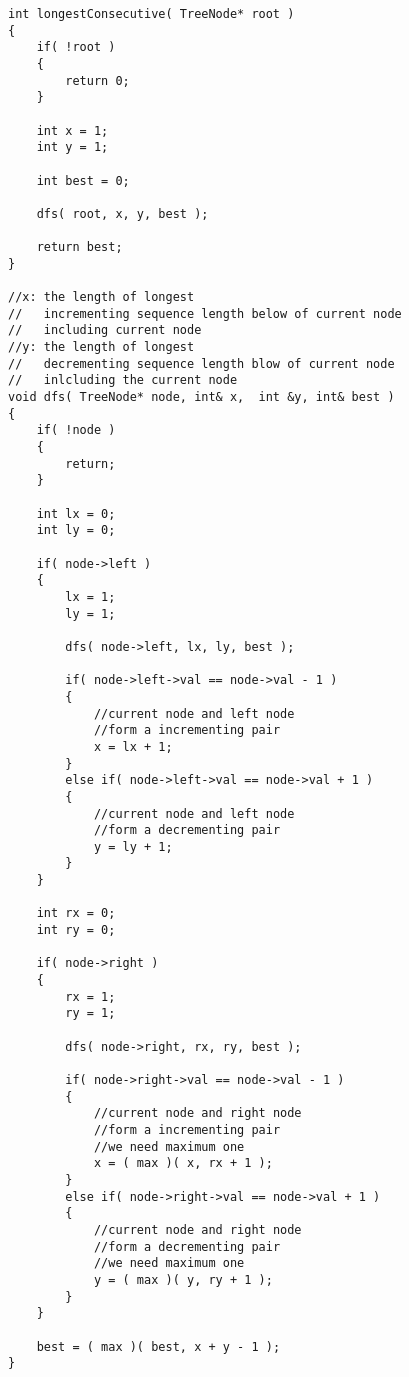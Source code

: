 \setcounter{lstlisting}{0}
\begin{lstlisting}[style=customc, caption={DFS}]
int longestConsecutive( TreeNode* root )
{
    if( !root )
    {
        return 0;
    }

    int x = 1;
    int y = 1;

    int best = 0;

    dfs( root, x, y, best );

    return best;
}

//x: the length of longest
//   incrementing sequence length below of current node
//   including current node
//y: the length of longest
//   decrementing sequence length blow of current node
//   inlcluding the current node
void dfs( TreeNode* node, int& x,  int &y, int& best )
{
    if( !node )
    {
        return;
    }

    int lx = 0;
    int ly = 0;

    if( node->left )
    {
        lx = 1;
        ly = 1;

        dfs( node->left, lx, ly, best );

        if( node->left->val == node->val - 1 )
        {
            //current node and left node
            //form a incrementing pair
            x = lx + 1;
        }
        else if( node->left->val == node->val + 1 )
        {
            //current node and left node
            //form a decrementing pair
            y = ly + 1;
        }
    }

    int rx = 0;
    int ry = 0;

    if( node->right )
    {
        rx = 1;
        ry = 1;

        dfs( node->right, rx, ry, best );

        if( node->right->val == node->val - 1 )
        {
            //current node and right node
            //form a incrementing pair
            //we need maximum one
            x = ( max )( x, rx + 1 );
        }
        else if( node->right->val == node->val + 1 )
        {
            //current node and right node
            //form a decrementing pair
            //we need maximum one
            y = ( max )( y, ry + 1 );
        }
    }

    best = ( max )( best, x + y - 1 );
}
\end{lstlisting}